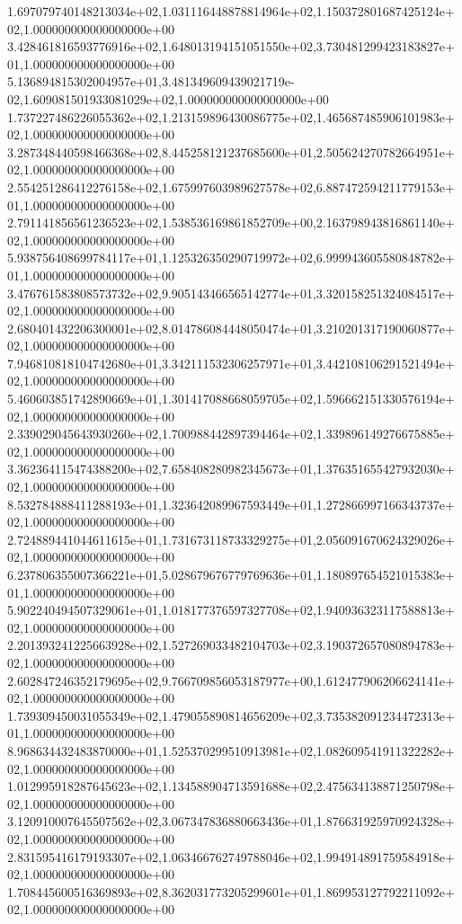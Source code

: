 1.697079740148213034e+02,1.031116448878814964e+02,1.150372801687425124e+02,1.000000000000000000e+00
3.428461816593776916e+02,1.648013194151051550e+02,3.730481299423183827e+01,1.000000000000000000e+00
5.136894815302004957e+01,3.481349609439021719e-02,1.609081501933081029e+02,1.000000000000000000e+00
1.737227486226055362e+02,1.213159896430086775e+02,1.465687485906101983e+02,1.000000000000000000e+00
3.287348440598466368e+02,8.445258121237685600e+01,2.505624270782664951e+02,1.000000000000000000e+00
2.554251286412276158e+02,1.675997603989627578e+02,6.887472594211779153e+01,1.000000000000000000e+00
2.791141856561236523e+02,1.538536169861852709e+00,2.163798943816861140e+02,1.000000000000000000e+00
5.938756408699784117e+01,1.125326350290719972e+02,6.999943605580848782e+01,1.000000000000000000e+00
3.476761583808573732e+02,9.905143466565142774e+01,3.320158251324084517e+02,1.000000000000000000e+00
2.680401432206300001e+02,8.014786084448050474e+01,3.210201317190060877e+02,1.000000000000000000e+00
7.946810818104742680e+01,3.342111532306257971e+01,3.442108106291521494e+02,1.000000000000000000e+00
5.460603851742890669e+01,1.301417088668059705e+02,1.596662151330576194e+02,1.000000000000000000e+00
2.339029045643930260e+02,1.700988442897394464e+02,1.339896149276675885e+02,1.000000000000000000e+00
3.362364115474388200e+02,7.658408280982345673e+01,1.376351655427932030e+02,1.000000000000000000e+00
8.532784888411288193e+01,1.323642089967593449e+01,1.272866997166343737e+02,1.000000000000000000e+00
2.724889441044611615e+01,1.731673118733329275e+01,2.056091670624329026e+02,1.000000000000000000e+00
6.237806355007366221e+01,5.028679676779769636e+01,1.180897654521015383e+01,1.000000000000000000e+00
5.902240494507329061e+01,1.018177376597327708e+02,1.940936323117588813e+02,1.000000000000000000e+00
2.201393241225663928e+02,1.527269033482104703e+02,3.190372657080894783e+02,1.000000000000000000e+00
2.602847246352179695e+02,9.766709856053187977e+00,1.612477906206624141e+02,1.000000000000000000e+00
1.739309450031055349e+02,1.479055890814656209e+02,3.735382091234472313e+01,1.000000000000000000e+00
8.968634432483870000e+01,1.525370299510913981e+02,1.082609541911322282e+02,1.000000000000000000e+00
1.012995918287645623e+02,1.134588904713591688e+02,2.475634138871250798e+02,1.000000000000000000e+00
3.120910007645507562e+02,3.067347836880663436e+01,1.876631925970924328e+02,1.000000000000000000e+00
2.831595416179193307e+02,1.063466762749788046e+02,1.994914891759584918e+02,1.000000000000000000e+00
1.708445600516369893e+02,8.362031773205299601e+01,1.869953127792211092e+02,1.000000000000000000e+00
